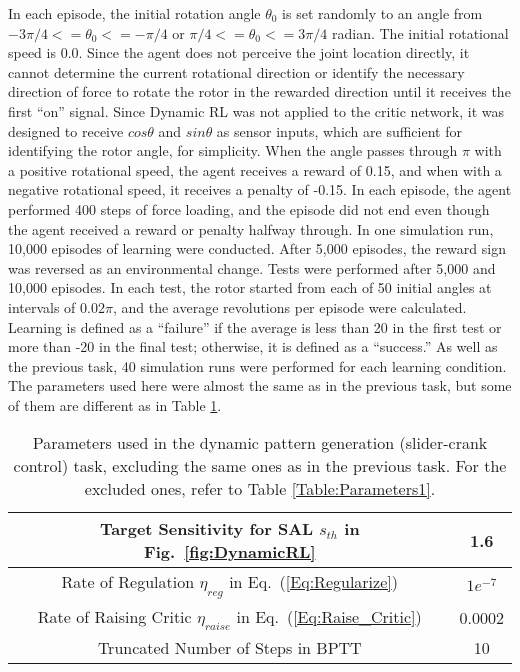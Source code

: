 In each episode, the initial rotation angle $\theta_0$ is set randomly
to an angle from $-3\pi/4 <= \theta_0 <= -\pi/4$ or $\pi/4<=\theta_0<=3\pi/4$ radian.
The initial rotational speed is 0.0.
Since the agent does not perceive the joint location directly,
it cannot determine the current rotational direction or identify the necessary direction of force
to rotate the rotor in the rewarded direction until it receives the first ``on'' signal.
Since Dynamic RL was not applied to the critic network,
it was designed to receive $cos \theta$ and $sin \theta$ as sensor inputs,
which are sufficient for identifying the rotor angle, for simplicity.
When the angle passes through $\pi$ with a positive rotational speed, the agent receives a reward of 0.15,
and when with a negative rotational speed, it receives a penalty of -0.15.
In each episode, the agent performed 400 steps of force loading,
and the episode did not end even though the agent received a reward or penalty halfway through.
In one simulation run, 10,000 episodes of learning were conducted.
After 5,000 episodes, the reward sign was reversed as an environmental change.
Tests were performed after 5,000 and 10,000 episodes.
In each test, the rotor started from each of 50 initial angles at intervals of $0.02\pi$,
and the average revolutions per episode were calculated.
Learning is defined as a ``failure'' if the average is less than 20 in the first test or more than -20 in the final test;
otherwise, it is defined as a ``success.''
As well as the previous task, 40 simulation runs were performed for each learning condition.
The parameters used here were almost the same as in the previous task,
but some of them are different as in Table \ref{Table:Parameters2}.\vspace{5mm}

\begin{table}[ht]
  \begin{center}
    \caption{Parameters used in the dynamic pattern generation (slider-crank control) task,
    excluding the same ones as in the previous task.
    For the excluded ones, refer to Table \ref{Table:Parameters1}.}
    \vspace{2mm}\small
      \begin{tabular}{c|c} \toprule
	Target Sensitivity for SAL  $s_{th}$ in Fig.~\ref{fig:DynamicRL}& 1.6\\ \midrule
	Rate of Regulation $\eta_{reg}$ in Eq.~(\ref{Eq:Regularize}) & $1e^{-7}$\\ \midrule
	Rate of Raising Critic $\eta_{raise}$ in Eq.~(\ref{Eq:Raise_Critic}) & 0.0002\\ \midrule
	Truncated Number of Steps in BPTT & 10\\ \midrule
      \end{tabular}
    \label{Table:Parameters2}
  \end{center}
\end{table}

